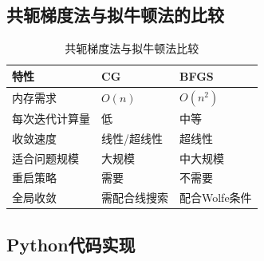 \subsection{共轭梯度法与拟牛顿法的比较}

\begin{table}[H]
\centering
\caption{共轭梯度法与拟牛顿法比较}
\begin{tabular}{@{}lll@{}}
\toprule
\textbf{特性} & \textbf{CG} & \textbf{BFGS} \\
\midrule
内存需求 & $O(n)$ & $O(n^2)$ \\
每次迭代计算量 & 低 & 中等 \\
收敛速度 & 线性/超线性 & 超线性 \\
适合问题规模 & 大规模 & 中大规模 \\
重启策略 & 需要 & 不需要 \\
全局收敛 & 需配合线搜索 & 配合Wolfe条件 \\
\bottomrule
\end{tabular}
\end{table}

\subsection{Python代码实现}\label{sec:conjugate-code}

